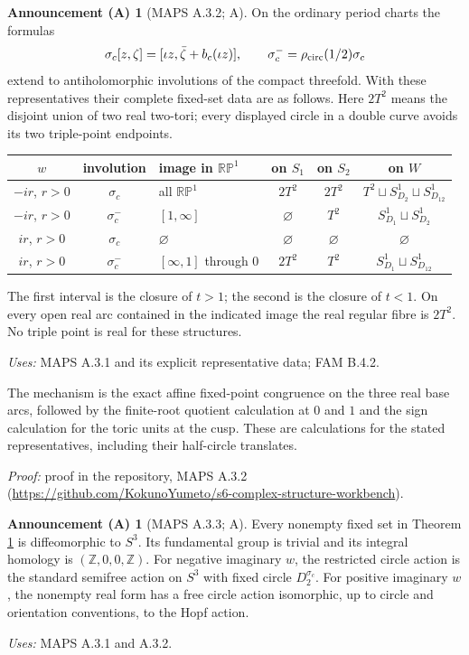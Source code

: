 \documentclass[11pt,a4paper]{article}
\theoremstyle{plain}
\theoremstyle{definition}
\newtheorem{announcement}[theorem]{Announcement (A)}
\newcommand{\Z}{\mathbb Z}
\begin{document}
\begin{announcement}[MAPS A.3.2; A]\label{maps:A.3.2}
On the ordinary period charts the formulas
\[
 \sigma_c[z,\zeta]=[\iota z,\bar\zeta+b_c(\iota z)],
 \qquad \sigma_c^- =\rho_{\rm circ}(1/2)\sigma_c
 \label{maps:eq:A.3.3}
\]
extend to antiholomorphic involutions of the compact threefold.
With these representatives their complete fixed-set data are as follows.
Here $2T^2$ means the disjoint union of two real two-tori; every displayed
circle in a double curve avoids its two triple-point endpoints.
\begin{center}\small
\begin{tabular}{cclccc}
\toprule
$w$&involution&image in $\mathbb{RP}^1$&on $S_1$&on $S_2$&on $W$\\
\midrule
$-ir$, $r>0$&$\sigma_c$&all $\mathbb{RP}^1$&$2T^2$&$2T^2$&$T^2\sqcup S^1_{D_2}\sqcup S^1_{D_{12}}$\\
$-ir$, $r>0$&$\sigma_c^-$&$[1,\infty]$&$\varnothing$&$T^2$&$S^1_{D_1}\sqcup S^1_{D_2}$\\
$ir$, $r>0$&$\sigma_c$&$\varnothing$&$\varnothing$&$\varnothing$&$\varnothing$\\
$ir$, $r>0$&$\sigma_c^-$&$[\infty,1]$ through $0$&$2T^2$&$T^2$&$S^1_{D_1}\sqcup S^1_{D_{12}}$\\
\bottomrule
\end{tabular}
\end{center}
The first interval is the closure of $t>1$; the second is the closure
of $t<1$. On every open real arc contained in the indicated image the
real regular fibre is $2T^2$. No triple point is real for these structures.
\end{announcement}
\noindent\emph{Uses:} MAPS A.3.1 and its explicit representative data; FAM B.4.2.\par

The mechanism is the exact affine fixed-point congruence on the three real base arcs, followed by the finite-root quotient calculation at $0$ and $1$ and the sign calculation for the toric units at the cusp. These are calculations for the stated representatives, including their half-circle translates.

\noindent\emph{Proof:} proof in the repository, MAPS A.3.2 (\url{https://github.com/KokunoYumeto/s6-complex-structure-workbench}).

\begin{announcement}[MAPS A.3.3; A]\label{maps:A.3.3}
Every nonempty fixed set in Theorem \ref{maps:A.3.2} is diffeomorphic to $S^3$.
Its fundamental group is trivial and its integral homology is
$(\Z,0,0,\Z)$. For negative imaginary $w$, the restricted circle action
is the standard semifree action on $S^3$ with fixed circle
$D_2^{\sigma_c}$. For positive imaginary $w$, the nonempty real form
has a free circle action isomorphic, up to circle and orientation
conventions, to the Hopf action.
\end{announcement}
\noindent\emph{Uses:} MAPS A.3.1 and A.3.2.\par
\end{document}
